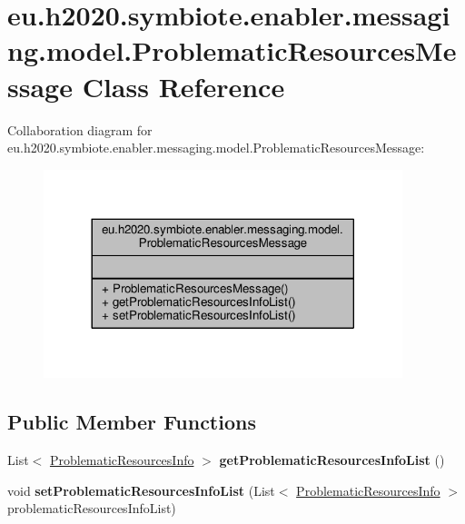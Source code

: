 \hypertarget{classeu_1_1h2020_1_1symbiote_1_1enabler_1_1messaging_1_1model_1_1ProblematicResourcesMessage}{}\section{eu.\+h2020.\+symbiote.\+enabler.\+messaging.\+model.\+Problematic\+Resources\+Message Class Reference}
\label{classeu_1_1h2020_1_1symbiote_1_1enabler_1_1messaging_1_1model_1_1ProblematicResourcesMessage}


Collaboration diagram for eu.\+h2020.\+symbiote.\+enabler.\+messaging.\+model.\+Problematic\+Resources\+Message\+:\nopagebreak
\begin{figure}[H]
\begin{center}
\leavevmode
\includegraphics[width=296pt]{classeu_1_1h2020_1_1symbiote_1_1enabler_1_1messaging_1_1model_1_1ProblematicResourcesMessage__coll__graph}
\end{center}
\end{figure}
\subsection*{Public Member Functions}
\begin{DoxyCompactItemize}
\item 
\mbox{\label{classeu_1_1h2020_1_1symbiote_1_1enabler_1_1messaging_1_1model_1_1ProblematicResourcesMessage_a9d3d07966c2f650a4c37af91830b6264}} 
List$<$ \hyperlink{classeu_1_1h2020_1_1symbiote_1_1enabler_1_1messaging_1_1model_1_1ProblematicResourcesInfo}{Problematic\+Resources\+Info} $>$ {\bfseries get\+Problematic\+Resources\+Info\+List} ()
\item 
\mbox{\label{classeu_1_1h2020_1_1symbiote_1_1enabler_1_1messaging_1_1model_1_1ProblematicResourcesMessage_aec33e6c29156da3916d2b8e5d1900a41}} 
void {\bfseries set\+Problematic\+Resources\+Info\+List} (List$<$ \hyperlink{classeu_1_1h2020_1_1symbiote_1_1enabler_1_1messaging_1_1model_1_1ProblematicResourcesInfo}{Problematic\+Resources\+Info} $>$ problematic\+Resources\+Info\+List)
\end{DoxyCompactItemize}


